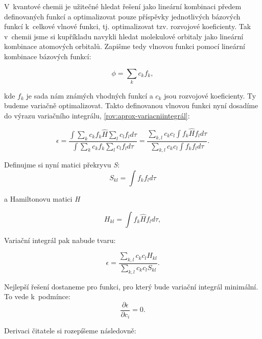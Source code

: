  V~kvantové chemii je užitečné hledat řešení jako lineární kombinaci předem definovaných funkcí a optimalizovat pouze příspěvky jednotlivých bázových funkcí k~celkové vlnové funkci, tj. optimalizovat tzv. rozvojové koeficienty. Tak v~chemii jsme si kupříkladu navykli hledat molekulové orbitaly jako lineární kombinace atomových orbitalů. Zapišme tedy vlnovou funkci pomocí lineární kombinace bázových funkcí:
 
 \begin{equation}
 \phi=\sum_k c_k f_k,
 \label{rov:aprox-Rayleigh-Ritz} 
 \end{equation}
 
\noindent kde $ f_k $ je sada nám známých vhodných funkcí a $ c_k $ jsou rozvojové koeficienty. Ty budeme variačně optimalizovat. Takto definovanou vlnovou funkci nyní dosadíme do výrazu variačního integrálu, \ref{rov:aprox-variacniintegrál}:
 
 \begin{equation}
\epsilon=\frac{\int\sum_k c_k f_k\hat{H}\sum_l c_l f_l d\tau}{\int\sum_k c_k f_k\sum_l c_l f_l d\tau}=\frac{\sum_{k,l} c_k c_l \int f_k \hat{H} f_ld\tau}{\sum_{k,l} c_k c_l \int f_k f_ld\tau}.
\label{rov:aprox-variacniintegrál2}
\end{equation}
 
 \noindent Definujme si nyní matici překryvu \textit{S}:
 \begin{equation}
 S_{kl}=\int f_k f_ld\tau
\end{equation}  
 
\noindent  a Hamiltonovu matici \textit{H}
 
  \begin{equation}
 H_{kl}=\int f_k \hat{H} f_ld\tau,
\end{equation}  
 
 \noindent Variační integrál pak nabude tvaru:
 
   \begin{equation}
 \epsilon=\frac{\sum_{k,l}c_k c_l H_{kl}}{\sum_{k,l}c_k c_l S_{kl}}.
\end{equation}  
 
 \noindent Nejlepší řešení dostaneme pro funkci, pro který bude variační integrál minimální. To vede k~podmínce:
 \begin{equation}
 \frac{\partial \epsilon}{\partial c_i}=0.
 \label{rov:aprox-derivace} 
 \end{equation}
 
 \noindent Derivaci čitatele si rozepíšeme následovně:
 
